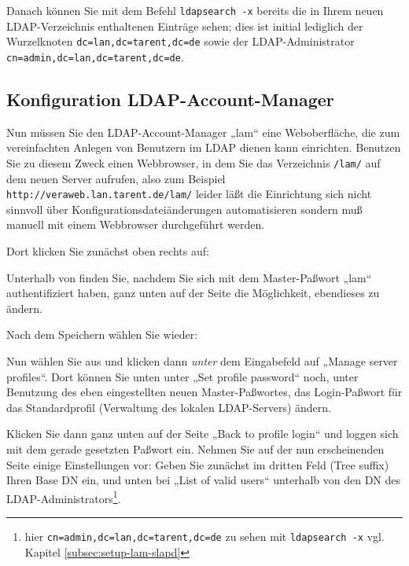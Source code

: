 \documentclass{tarentanleitung}
\begin{document}
Danach können Sie mit dem Befehl \texttt{ldapsearch -x} bereits die in
Ihrem neuen LDAP-Verzeichnis enthaltenen Einträge sehen; dies ist initial
lediglich der Wurzelknoten \texttt{dc=lan,dc=tarent,dc=de} sowie der
LDAP-Administrator \texttt{cn=admin,dc=lan,dc=tarent,dc=de}.

\subsection{Konfiguration LDAP-Account-Manager}\label{subsec:setup-lam-cfg}

Nun müssen Sie den LDAP-Account-Manager „lam“ \dash eine Weboberfläche,
die zum vereinfachten Anlegen von Benutzern im LDAP dienen kann \dash
einrichten. Benutzen Sie zu diesem Zweck einen Webbrowser, in dem Sie
das Verzeichnis \texttt{/lam/} auf dem neuen Server aufrufen, also zum
Beispiel \texttt{http://veraweb.lan.tarent.de/lam/} \dash leider läßt
die Einrichtung sich nicht sinnvoll über Konfigurationsdateiänderungen
automatisieren sondern muß manuell mit einem Webbrowser durchgeführt
werden.

Dort klicken Sie zunächst oben rechts auf:

Unterhalb von  finden
Sie, nachdem Sie sich mit dem Master-Paßwort „lam“ authentifiziert
haben, ganz unten auf der Seite die Möglichkeit, ebendieses zu ändern.

Nach dem Speichern wählen Sie wieder:

Nun wählen Sie  aus und
klicken dann \emph{unter} dem Eingabefeld auf „Manage server profiles“.
Dort können Sie unten unter „Set profile password“ noch, unter Benutzung
des eben eingestellten neuen Master-Paßwortes, das Login-Paßwort für das
Standardprofil (Verwaltung des lokalen LDAP-Servers) ändern.

Klicken Sie dann ganz unten auf der Seite „Back to profile login“ und
loggen sich mit dem gerade gesetzten Paßwort ein. Nehmen Sie auf der
nun erscheinenden Seite einige Einstellungen vor: Geben Sie zunächst im
dritten Feld (Tree suffix) Ihren Base DN ein, und unten bei „List of
valid users“ unterhalb von 
den DN des LDAP-Administrators\Hair\footnote{hier
\texttt{cn=admin,dc=lan,dc=tarent,dc=de} \dash zu sehen mit
\texttt{ldapsearch -x} \dash vgl. Kapitel \ref{subsec:setup-lam-slapd}}.
\end{document}

